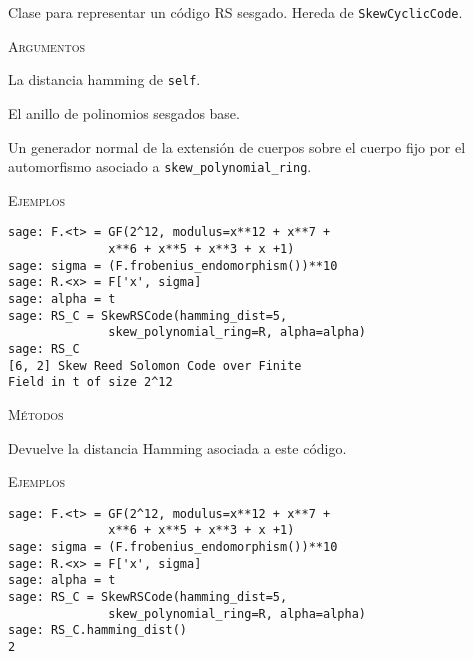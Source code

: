 \begin{description}[font=\ttfamily, style=nextline]
    \item[class SkewRSCode(self, hamming\_dist=None, \\skew\_polynomial\_ring=None, alpha=None)]

    Clase para representar un código RS sesgado. Hereda de \texttt{SkewCyclicCode}.

    \textsc{Argumentos}
    \begin{description}[font=\ttfamily, style=nextline]
        \item[hamming\_dist] La distancia hamming de \texttt{self}.
        \item[skew\_polynomial\_ring] El anillo de polinomios sesgados base.
        \item[alpha] Un generador normal de la extensión de cuerpos sobre el cuerpo fijo por el automorfismo asociado a \texttt{skew\_polynomial\_ring}.
    \end{description}

    \textsc{Ejemplos}
    \begin{lstlisting}
sage: F.<t> = GF(2^12, modulus=x**12 + x**7 +
              x**6 + x**5 + x**3 + x +1)
sage: sigma = (F.frobenius_endomorphism())**10
sage: R.<x> = F['x', sigma]
sage: alpha = t
sage: RS_C = SkewRSCode(hamming_dist=5,
              skew_polynomial_ring=R, alpha=alpha)
sage: RS_C
[6, 2] Skew Reed Solomon Code over Finite
Field in t of size 2^12
    \end{lstlisting}

    \textsc{Métodos}
    \begin{description}[font=\ttfamily, style=nextline]
        \item[hamming\_dist(self)]
            Devuelve la distancia Hamming asociada a este código.

        \textsc{Ejemplos}
        \begin{lstlisting}
sage: F.<t> = GF(2^12, modulus=x**12 + x**7 +
              x**6 + x**5 + x**3 + x +1)
sage: sigma = (F.frobenius_endomorphism())**10
sage: R.<x> = F['x', sigma]
sage: alpha = t
sage: RS_C = SkewRSCode(hamming_dist=5,
              skew_polynomial_ring=R, alpha=alpha)
sage: RS_C.hamming_dist()
2
        \end{lstlisting}
    \end{description}
\end{description}

